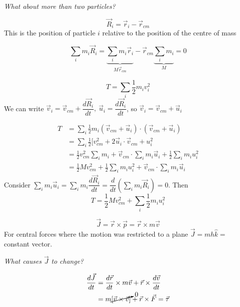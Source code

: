 \documentclass[10pt]{scrartcl}
\begin{document}
\emph{What about more than two particles?}\\

\begin{definition}
\[\vec{R}_i = \vec{r}_i - \vec{r}_{cm}\]	
This is the position of particle $i$ relative to the position of the centre of mass
\end{definition}

\[\sum_im_i\vec{R}_i = \underbrace{\sum_im_i\vec{r}_i}_{M\vec{r}_{cm}}- \vec{r}_{cm}\underbrace{\sum_im_i}_{M} = 0\]






\[T = \sum_i \frac{1}{2}m_iv_i^2\]
We can write $\vec{v}_i = \vec{v}_{cm} + \dfrac{d\vec{R}_i}{dt},~\vec{u}_i = \dfrac{d\vec{R}_i}{dt}$, so $\vec{v}_i = \vec{v}_{cm} + \vec{u}_i$

\[\begin{aligned}T &= \sum_i \frac{1}{2}m_i(\vec{v}_{cm}+\vec{u}_i) \cdot(\vec{v}_{cm}+\vec{u}_i)\\
&= \sum_i \frac{1}{2}[v_{cm}^2 + 2\vec{u}_i\cdot\vec{v}_{cm} + u_i^2\\
&= 	\frac{1}{2}v_{cm}^2\sum_i m_i + \vec{v}_{cm}\cdot\sum_im_i\vec{u}_i + \frac{1}{2}\sum_im_iu_i^2\\
&= \frac{1}{2}Mv_{cm}^2 + \frac{1}{2}\sum_im_iu_i^2 + \vec{v}_{cm}\cdot\sum_im_i\vec{u}_i
\end{aligned}
\]
Consider $\sum_i m_i\vec{u}_i = \sum_im_i\dfrac{d\vec{R}_i}{dt} = \dfrac{d}{dt}(\sum_i m_i\vec{R}_i) = 0$. Then 
\begin{equation}\boxed{T = \frac{1}{2}Mv_{cm}^2 + \sum_i\frac{1}{2}m_iu_i^2}\end{equation}


\[\vec{J} = \vec{r} \times \vec{p} = \vec{r} \times m\vec{v}\]
For central forces where the motion was restricted to a plane $\vec{J} = mh\hat{k} =$ constant vector. 

\emph{What causes $\vec{J}$ to change?}

\[\begin{aligned}\frac{d\vec{J}}{dt} &= \frac{d\vec{r}}{dt} \times m \vec{v} + \vec{r}\times \frac{d\vec{v}}{dt}\\ &= m\cancelto{0}{[\vec{v} \times \vec{v}]} + \vec{r} \times \vec{F} = \vec{\tau}\end{aligned}
\]
\end{document}
